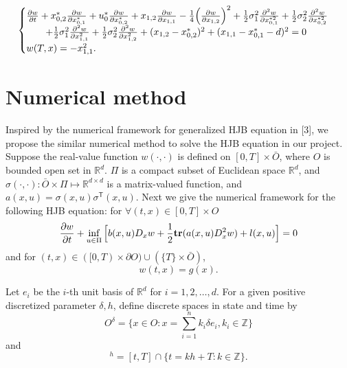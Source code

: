\documentclass{article}
\begin{document}
\begin{equation*}
    \begin{cases}
    \frac{\partial w}{\partial t} + x_{0,2}^{*} \frac{\partial w}{\partial x_{0, 1}^{*}} + u_{0}^{*} \frac{\partial w}{\partial x_{0, 2}^{*}} + x_{1,2} \frac{\partial w}{\partial x_{1, 1}} - \frac{1}{4} \Big{(}\frac{\partial w}{\partial x_{1, 2}} \Big{)}^{2} + \frac{1}{2} \sigma_{1}^{2} \frac{\partial^{2} w}{\partial x_{0, 1}^{* 2}} + \frac{1}{2} \sigma_{2}^{2} \frac{\partial^{2} w}{\partial x_{0, 2}^{* 2}}  \\
   \qquad + \frac{1}{2} \sigma_{1}^{2} \frac{\partial^{2} w}{\partial x_{1, 1}^{2}} + \frac{1}{2} \sigma_{2}^{2} \frac{\partial^{2} w}{\partial x_{1, 2}^{2}} + (x_{1, 2} - x_{0, 2}^{*})^{2} + (x_{1, 1} - x_{0, 1}^{*} - d)^{2}   = 0  \\
   w(T, x) = - x_{1, 1}^{2}.
   \end{cases}
\end{equation*}

\section{Numerical method}

Inspired by the numerical framework for generalized HJB equation in [3], we propose the similar numerical method to solve the HJB equation in our project. Suppose the real-value function $w(\cdot, \cdot)$ is defined on $[0, T] \times \bar{O}$, where $O$ is bounded open set in $\mathbb{R}^{d}$. $\Pi$ is a compact subset of Euclidean space $\mathbb{R}^{d}$, and $\sigma(\cdot, \cdot): \bar{O} \times \Pi \mapsto \mathbb{R}^{d \times d}$ is a matrix-valued function, and $a(x, u) = \sigma(x, u) \sigma^\mathsf{T} (x, u)$. Next we give the numerical framework for the following HJB equation: for $\forall (t, x) \in [0, T] \times O$
\begin{equation} \label{HJB, numerical}
    \frac{\partial w}{\partial t} + \inf_{u \in \Pi} \Big{[} b(x, u) D_{x} w + \frac{1}{2} \textbf{tr} (a(x, u) D_{x}^{2} w) + l(x, u) \Big{]} = 0
\end{equation}
and for $(t, x) \in ([0, T) \times \partial O) \cup (\{T\} \times \bar{O})$,
\begin{equation*}
    w(t, x) = g(x).
\end{equation*}

Let $e_{i}$ be the $i$-th unit basis of $\mathbb{R}^{d}$ for $i = 1, 2, \dots, d$. For a given positive discretized parameter $\delta, h$, define discrete spaces in state and time by
\begin{equation}
    O^{\delta} = \{x \in O: x = \sum_{i = 1}^{n} k_{i} \delta e_{i}, k_{i} \in \mathbb{Z} \}
\end{equation}
and
\begin{equation}
    [t, T]^{h} = [t, T] \cap \{t = k h + T: k \in \mathbb{Z} \}.
\end{equation}
\end{document}
